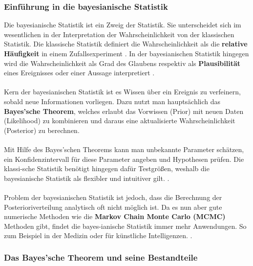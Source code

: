 \documentclass[a4paper,12pt]{article}
\begin{document}
\subsubsection{Einführung in die bayesianische Statistik}

Die bayesianische Statistik ist ein Zweig der Statistik. Sie unterscheidet sich im wesentlichen in der Interpretation der Wahrscheinlichkeit von der klassischen Statistik. Die klassische Statistik definiert die Wahrscheinlichkeit als die \textbf{relative Häufigkeit} in einem Zufallsexperiment \parencite[2]{StatistikKlassischOderBayes}. In der bayesianischen Statistik hingegen wird die Wahrscheinlichkeit als Grad des Glaubens respektiv als \textbf{Plausibilität} eines Ereignisses oder einer Aussage interpretiert \parencite[1]{EinfBayesStatistik}. \\\\
Kern der bayesianischen Statistik ist es Wissen über ein Ereignis zu verfeinern, sobald neue Informationen vorliegen. Dazu nutzt man hauptsächlich das \textbf{Bayes'sche Theorem}, welches erlaubt das Vorwissen (Prior) mit neuen Daten (Likelihood) zu kombinieren und daraus eine aktualisierte Wahrscheinlichkeit (Posterior) zu berechnen. \\\\
Mit Hilfe des Bayes'schen Theorems kann man unbekannte Parameter schätzen, ein Konfidenzintervall für diese Parameter angeben und Hypothesen prüfen. Die klassi-sche Statistik benötigt hingegen dafür Testgrößen, weshalb die bayesianische Statistik als flexibler und intuitiver gilt. \parencite[1]{EinfBayesStatistik}. \\\\
Problem der bayesianischen Statistik ist jedoch, dass die Berechnung der Posterioriverteilung analytisch oft nicht möglich ist. Da es nun aber gute numerische Methoden wie die \textbf{Markov Chain Monte Carlo (MCMC)} Methoden gibt, findet die bayes-ianische Statistik immer mehr Anwendungen. So zum Beispiel in der Medizin oder für künstliche Intelligenzen. \parencite[1]{StatistikKlassischOderBayes}.

\subsubsection{Das Bayes'sche Theorem und seine Bestandteile}
\end{document}
